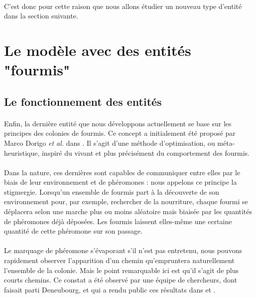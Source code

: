 \documentclass[a4paper, 10pt]{report}
\begin{document}
\paragraph{}C'est donc pour cette raison que nous allons étudier un nouveau type d'entité dans la section suivante. 

	\section{Le modèle avec des entités "fourmis"}
	
		\subsection{Le fonctionnement des entités}

\paragraph{}Enfin, la dernière entité que nous développons actuellement se base sur les principes des colonies de fourmis. Ce concept a initialement été proposé par Marco Dorigo \textit{et al.} dans \cite{Colorni1992Distributed}. Il s'agit d'une méthode d'optimisation, ou méta-heuristique, inspiré du vivant et plus précisément du comportement des fourmis.

\paragraph{}Dans la nature, ces dernières sont capables de communiquer entre elles par le biais de leur environnement et de phéromones : nous appelons ce principe la stigmergie. Lorsqu'un ensemble de fourmis part à la découverte de son environnement pour, par exemple, rechercher de la nourriture, chaque fourmi se déplacera selon une marche plus ou moins aléatoire mais biaisée par les quantités de phéromones déjà déposées. Les fourmis laissent elles-même une certaine quantité de cette phéromone sur son passage.

\paragraph{}Le marquage de phéromone s'évaporant s'il n'est pas entretenu, nous pouvons rapidement observer l'apparition d'un chemin qu'empruntera naturellement l'ensemble de la colonie. Mais le point remarquable ici est qu'il s'agit de plus courts chemins. Ce constat a été observé par une équipe 
de chercheurs, dont faisait parti Deneubourg, et qui a rendu public ces résultats dans \cite{Goss1989Self} et \cite{Deneubourg1990Self}.
\end{document}
